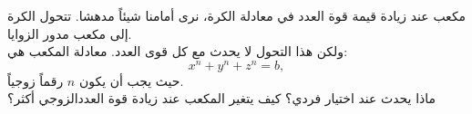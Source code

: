 \begin{surferPage}[مكعب]{مكعب}
عند زيادة قيمة قوة العدد في معادلة الكرة، نرى أمامنا شيئاً مدهشا. تتحول الكرة إلى مكعب مدور الزوايا.\\
\vspace{0.3cm}
ولكن هذا التحول لا يحدث مع كل قوى العدد. معادلة المكعب هي:
\[x^n+y^n+z^n=b,\]
حيث يجب أن يكون $n$ رقماً زوجياً.\\
\vspace{0.3cm}
ماذا يحدث عند اختيار فردي؟ كيف يتغير المكعب عند زيادة قوة العددالزوجي أكثر؟
\end{surferPage}